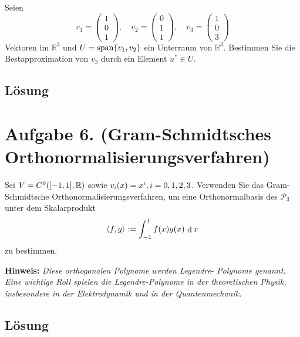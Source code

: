 \documentclass[german,12pt]{homework}
\newcommand{\RR}{\mathbb{R}}
\newcommand{\dotproduct}[2]{\left\langle#1, #2\right\rangle}
\newcommand{\dd}{\,\differ}
\DeclareMathOperator{\differ}{d}
\DeclareMathOperator{\vecspan}{span}
\DeclarePairedDelimiter{\enbrace}{(}{)}
\DeclarePairedDelimiter{\benbrace}{[}{]}
\DeclarePairedDelimiter{\penbrace}{\{}{\}}
\begin{document}
    \begin{problem}
        Seien
        \[v_1 = \begin{pmatrix}1\\0\\1\end{pmatrix}, \quad v_2 =
        \begin{pmatrix}0\\1\\1\end{pmatrix}, \quad v_3 =
        \begin{pmatrix}1\\0\\3\end{pmatrix}\]
        Vektoren im \(\RR^3\) und \(U = \vecspan\penbrace*{v_1, v_2}\) ein
        Unterraum von \(\RR^3\). Bestimmen Sie die Bestapproximation von
        \(v_3\) durch ein Element \(u^* \in U\).
    \end{problem}

    \subsection*{Lösung}

    \section*{Aufgabe 6. (Gram-Schmidtsches Orthonormalisierungsverfahren)}

    \begin{problem}
        Sei \(V = C^0\enbrace*{\benbrace*{-1, 1}, \RR}\) sowie
        \(v_i\enbrace*{x} = x^i, i = 0, 1, 2, 3\). Verwenden Sie das Gram-
        Schmidtsche Orthonormalisierungsverfahren, um eine Orthonormalbasis des
        \(\mathcal{P}_3\) unter dem Skalarprodukt
        \[\dotproduct{f}{g} := \int_{-1}^1f\enbrace*{x}g\enbrace*{x}\dd{x}\]
        zu bestimmen.

        \textbf{Hinweis:} \emph{Diese orthogonalen Polynome werden Legendre-
        Polynome genannt. Eine wichtige Roll spielen die Legendre-Polynome in
        der theoretischen Physik, insbesondere in der Elektrodynamik und in der
        Quantenmechanik.}
    \end{problem}

    \subsection*{Lösung}
\end{document}
